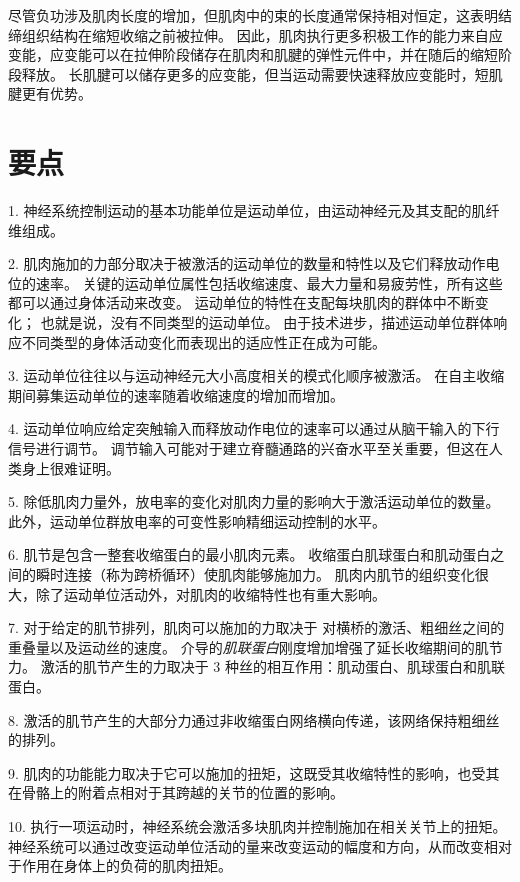 尽管负功涉及肌肉长度的增加，但肌肉中的束的长度通常保持相对恒定，这表明结缔组织结构在缩短收缩之前被拉伸。
因此，肌肉执行更多积极工作的能力来自应变能，应变能可以在拉伸阶段储存在肌肉和肌腱的弹性元件中，并在随后的缩短阶段释放。
长肌腱可以储存更多的应变能，但当运动需要快速释放应变能时，短肌腱更有优势。



\section{要点}

1. 神经系统控制运动的基本功能单位是运动单位，由运动神经元及其支配的肌纤维组成。 


2. 肌肉施加的力部分取决于被激活的运动单位的数量和特性以及它们释放动作电位的速率。
关键的运动单位属性包括收缩速度、最大力量和易疲劳性，所有这些都可以通过身体活动来改变。
运动单位的特性在支配每块肌肉的群体中不断变化；
也就是说，没有不同类型的运动单位。
由于技术进步，描述运动单位群体响应不同类型的身体活动变化而表现出的适应性正在成为可能。


3. 运动单位往往以与运动神经元大小高度相关的模式化顺序被激活。
在自主收缩期间募集运动单位的速率随着收缩速度的增加而增加。


4. 运动单位响应给定突触输入而释放动作电位的速率可以通过从脑干输入的下行信号进行调节。
调节输入可能对于建立脊髓通路的兴奋水平至关重要，但这在人类身上很难证明。


5. 除低肌肉力量外，放电率的变化对肌肉力量的影响大于激活运动单位的数量。
此外，运动单位群放电率的可变性影响精细运动控制的水平。


6. 肌节是包含一整套收缩蛋白的最小肌肉元素。
收缩蛋白肌球蛋白和肌动蛋白之间的瞬时连接（称为跨桥循环）使肌肉能够施加力。
肌肉内肌节的组织变化很大，除了运动单位活动外，对肌肉的收缩特性也有重大影响。


7. 对于给定的肌节排列，肌肉可以施加的力取决于  对横桥的激活、粗细丝之间的重叠量以及运动丝的速度。
 介导的\textit{肌联蛋白}刚度增加增强了延长收缩期间的肌节力。
激活的肌节产生的力取决于 3 种丝的相互作用：肌动蛋白、肌球蛋白和肌联蛋白。


8. 激活的肌节产生的大部分力通过非收缩蛋白网络横向传递，该网络保持粗细丝的排列。


9. 肌肉的功能能力取决于它可以施加的扭矩，这既受其收缩特性的影响，也受其在骨骼上的附着点相对于其跨越的关节的位置的影响。


10. 执行一项运动时，神经系统会激活多块肌肉并控制施加在相关关节上的扭矩。
神经系统可以通过改变运动单位活动的量来改变运动的幅度和方向，从而改变相对于作用在身体上的负荷的肌肉扭矩。


